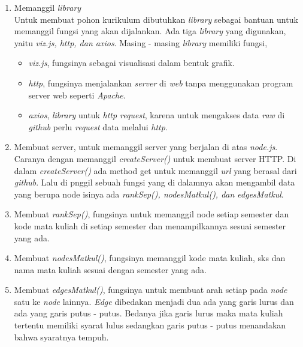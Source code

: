 \begin{enumerate}
\item Memanggil \textit{library}\\
Untuk membuat pohon kurikulum dibutuhkan \textit{library} sebagai bantuan untuk memanggil fungsi yang akan dijalankan. Ada tiga \textit{library} yang digunakan, yaitu \textit{viz.js, http, dan axios}. Masing - masing \textit{library} memiliki fungsi,
\begin{itemize}
\item \textit{viz.js}, fungsinya sebagai visualisasi dalam bentuk grafik.
\item \textit{http}, fungsinya menjalankan \textit{server} di \textit{web} tanpa menggunakan program server web seperti \textit{Apache}. 
\item \textit{axios}, \textit{library} untuk \textit{http request}, karena untuk mengakses data \textit{raw} di \textit{github} perlu \textit{request} data melalui \textit{http}.
\end{itemize} 
\item Membuat server, untuk memanggil server yang berjalan di atas \textit{node.js}. Caranya dengan memanggil \textit{createServer()} untuk membuat server HTTP. Di dalam \textit{createServer()} ada method get untuk memanggil \textit{url} yang berasal dari \textit{github}. Lalu di pnggil sebuah fungsi yang di dalamnya akan mengambil data yang berupa node isinya ada \textit{rankSep(), nodesMatkul(), dan edgesMatkul}.
\item Membuat \textit{rankSep()}, fungsinya untuk memanggil node setiap semester dan kode mata kuliah di setiap semester dan menampilkannya sesuai semester yang ada.
\item Membuat \textit{nodesMatkul()}, fungsinya memanggil kode mata kuliah, sks dan nama mata kuliah sesuai dengan semester yang ada. 
\item Membuat \textit{edgesMatkul()}, fungsinya untuk membuat arah setiap pada \textit{node} satu ke \textit{node} lainnya. \textit{Edge} dibedakan menjadi dua ada yang garis lurus dan ada yang garis putus - putus. Bedanya jika garis lurus maka mata kuliah tertentu memiliki syarat lulus sedangkan garis putus - putus menandakan bahwa syaratnya tempuh.

\end{enumerate}


